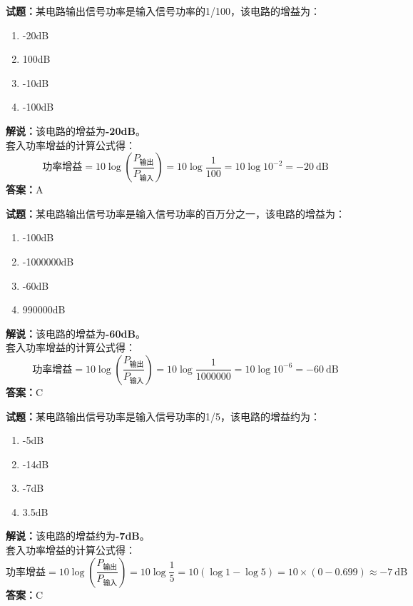 \documentclass{ctexbook}
\begin{document}
\bigskip




\noindent\textbf{试题：}某电路输出信号功率是输入信号功率的1/100，该电路的增益为：
\begin{enumerate}[leftmargin=3em]
\item -20dB
\item 100dB
\item -10dB
\item -100dB
\end{enumerate}
\noindent\textbf{解说：}该电路的增益为\textbf{-20dB}。\\
套入功率增益的计算公式得：
$$\mbox{功率增益}=10 \log \left( {\frac{P_{ \mbox{输出} }}{P_{ \mbox{输入} }}} \right)=10 \log \frac{1}{100}=10 \log 10^{-2}=-20 \ \mathrm{dB}$$
\noindent\textbf{答案：}A

\bigskip




\noindent\textbf{试题：}某电路输出信号功率是输入信号功率的百万分之一，该电路的增益为：
\begin{enumerate}[leftmargin=3em]
\item -100dB
\item -1000000dB
\item -60dB
\item 990000dB
\end{enumerate}
\noindent\textbf{解说：}该电路的增益为\textbf{-60dB}。\\
套入功率增益的计算公式得：
$$\mbox{功率增益}=10 \log \left( {\frac{P_{ \mbox{输出} }}{P_{ \mbox{输入} }}} \right)=10 \log \frac{1}{1000000}=10 \log 10^{-6}=-60 \ \mathrm{dB}$$
\noindent\textbf{答案：}C

\bigskip




\noindent\textbf{试题：}某电路输出信号功率是输入信号功率的1/5，该电路的增益约为：
\begin{enumerate}[leftmargin=3em]
\item -5dB
\item -14dB
\item -7dB
\item 3.5dB
\end{enumerate}
\noindent\textbf{解说：}该电路的增益约为\textbf{-7dB}。\\
套入功率增益的计算公式得：
$$\mbox{功率增益}=10 \log \left( {\frac{P_{ \mbox{输出} }}{P_{ \mbox{输入} }}} \right)=10 \log \frac{1}{5}=10 \left( \log 1 - \log 5 \right) = 10 \times \left( 0 - 0.699 \right) \approx -7 \ \mathrm{dB}$$
\noindent\textbf{答案：}C
\end{document}
